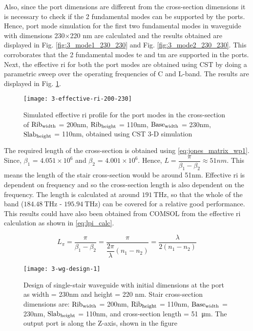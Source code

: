 \documentclass[../report.tex]{subfiles}
\begin{document}
\noindent Also, since the port dimensions are different from the cross-section dimensions it is necessary to check if the 2 fundamental modes can be supported by the ports. Hence, port mode simulation for the first two fundamental modes in waveguide with dimensions 230$\times$220 nm are calculated and the results obtained are displayed in Fig. \ref{fig:3_mode1_230_230} and Fig. \ref{fig:3_mode2_230_230}. This corroborates that the 2 fundamental modes \gls{te} and \gls{tm} are supported in the ports.\\

\noindent Next, the effective \gls{ri} for both the port modes are obtained using CST by doing a parametric sweep over the operating frequencies of C and L-band. The results are displayed in Fig. \ref{fig:3_effective_ri_200_230}. 

\begin{figure}[H] %
	\centering
	\texttt{[image: 3-effective-ri-200-230]}
	\caption{Simulated effective \gls{ri} profile for the port modes in the cross-section of $\mathrm{Rib_{width}}$ = 200nm, $\mathrm{Rib_{height}}$ = 110nm, $\mathrm{Base_{width}}$ = 230nm, $\mathrm{Slab_{height}}$ = 110nm, obtained using CST 3-D simulation}
	\label{fig:3_effective_ri_200_230}
\end{figure}

\noindent The required length of the cross-section is obtained using \ref{eq:jones_matrix_wp1}. Since, $\beta_1$ = $4.051 \times 10^6$  and $\beta_2$ = $4.001 \times 10^6$. Hence, $L = \dfrac{\pi}{\beta_1 - \beta_2} \approx 51nm$. This means the length of the stair cross-section would be around 51nm. Effective \gls{ri} is dependent on frequency and so the cross-section length is also dependent on the frequency. The length is calculated at around $\SI{191}{\THz}$, so that the whole of the band ($\SI{184.48}{\THz}$ - $\SI{195.94}{\THz}$) can be covered for a relative good performance. This results could have also been obtained from COMSOL from the effective \gls{ri} calculation as shown in \ref{eq:lpi_calc}.

\begin{equation}\label{eq:lpi_calc}
L_\pi =  \dfrac {\pi} {\beta_1 - \beta_2} = \dfrac {\pi} {\dfrac {2\pi} {\lambda}\left(n_1 - n_2\right)} = \dfrac {\lambda} {2(n_1 - n_2)}
\end{equation}

\begin{figure}[H] %
	\centering
	\texttt{[image: 3-wg-design-1]}
	\caption{Design of single-stair waveguide with initial dimensions at the port as width = 230nm and height = 220 nm. Stair cross-section dimensions are: $\mathrm{Rib_{width}}$ = 200nm, $\mathrm{Rib_{height}}$ = 110nm, $\mathrm{Base_{width}}$ = 230nm, $\mathrm{Slab_{height}}$ = 110nm, and cross-section length = \SI{51}{\micro\meter}. The output port is along the Z-axis, shown in the figure}
	\label{fig:3_wg_design_1}
\end{figure}
\end{document}
